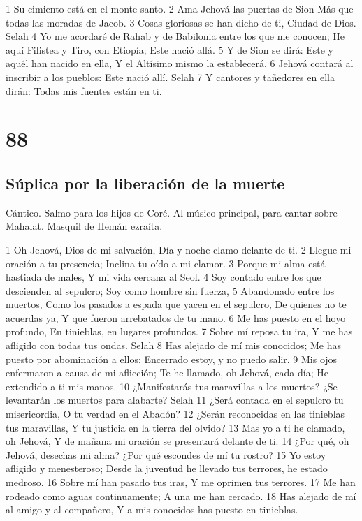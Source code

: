1 Su cimiento está en el monte santo.
2 Ama Jehová las puertas de Sion
Más que todas las moradas de Jacob.
3 Cosas gloriosas se han dicho de ti,
Ciudad de Dios. Selah
4 Yo me acordaré de Rahab y de Babilonia entre los que me conocen;
He aquí Filistea y Tiro, con Etiopía;
Este nació allá.
5 Y de Sion se dirá: Este y aquél han nacido en ella,
Y el Altísimo mismo la establecerá.
6 Jehová contará al inscribir a los pueblos:
Este nació allí. Selah
7 Y cantores y tañedores en ella dirán:
Todas mis fuentes están en ti.

\chapter{88}

\section*{Súplica por la liberación de la muerte}

Cántico. Salmo para los hijos de Coré. Al músico principal, para cantar sobre Mahalat. Masquil de Hemán ezraíta.

1 Oh Jehová, Dios de mi salvación,
Día y noche clamo delante de ti.
2 Llegue mi oración a tu presencia;
Inclina tu oído a mi clamor.
3 Porque mi alma está hastiada de males,
Y mi vida cercana al Seol.
4 Soy contado entre los que descienden al sepulcro;
Soy como hombre sin fuerza,
5 Abandonado entre los muertos,
Como los pasados a espada que yacen en el sepulcro,
De quienes no te acuerdas ya,
Y que fueron arrebatados de tu mano.
6 Me has puesto en el hoyo profundo,
En tinieblas, en lugares profundos.
7 Sobre mí reposa tu ira,
Y me has afligido con todas tus ondas. Selah
8 Has alejado de mí mis conocidos;
Me has puesto por abominación a ellos;
Encerrado estoy, y no puedo salir.
9 Mis ojos enfermaron a causa de mi aflicción;
Te he llamado, oh Jehová, cada día;
He extendido a ti mis manos.
10 ¿Manifestarás tus maravillas a los muertos?
¿Se levantarán los muertos para alabarte? Selah
11 ¿Será contada en el sepulcro tu misericordia,
O tu verdad en el Abadón?
12 ¿Serán reconocidas en las tinieblas tus maravillas,
Y tu justicia en la tierra del olvido?
13 Mas yo a ti he clamado, oh Jehová,
Y de mañana mi oración se presentará delante de ti.
14 ¿Por qué, oh Jehová, desechas mi alma?
¿Por qué escondes de mí tu rostro?
15 Yo estoy afligido y menesteroso;
Desde la juventud he llevado tus terrores, he estado medroso.
16 Sobre mí han pasado tus iras,
Y me oprimen tus terrores.
17 Me han rodeado como aguas continuamente;
A una me han cercado.
18 Has alejado de mí al amigo y al compañero,
Y a mis conocidos has puesto en tinieblas.

